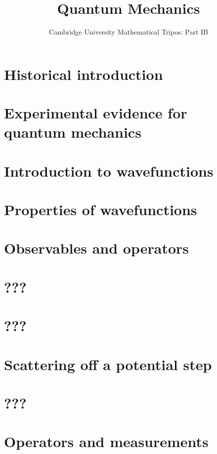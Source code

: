 \documentclass{article}
\title{Quantum Mechanics}
\author{Cambridge University Mathematical Tripos: Part IB}
\begin{document}
\maketitle

\tableofcontentsnewpage{}

\section{Historical introduction}

\section{Experimental evidence for quantum mechanics}

\section{Introduction to wavefunctions}

\section{Properties of wavefunctions}

\section{Observables and operators}

\section{???}

\section{???}

\section{Scattering off a potential step}

\section{???}

\section{Operators and measurements}

\end{document}
